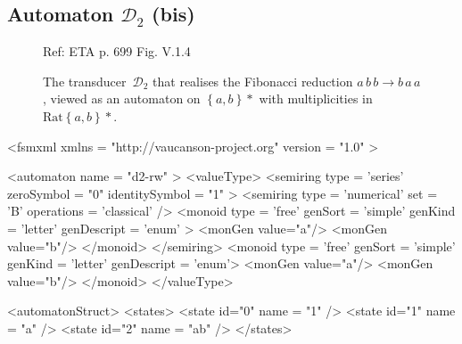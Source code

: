 \subsection{Automaton $\mathcal{D}_{2}$ (bis)}
\label{automatonD2rw}
\begin{figure}[h]
  \begin{minipage}[c]{.60\textwidth}
    Ref: ETA p. 699  Fig. V.1.4

    The transducer~$\mathcal{D}_{2}$ that realises the Fibonacci reduction 
    $a\, b\, b \rightarrow b\, a\, a$, viewed as an automaton on 
    $\left\{ a,b \right\}*$ with multiplicities in $\mathrm{Rat}\left\{ a,b \right\}*$.
  \end{minipage}
  \begin{minipage}[c]{.40\textwidth}


  \end{minipage}
\end{figure}

{\footnotesize 
\begin{listing}[5]{1} 
<fsmxml  xmlns   = "http://vaucanson-project.org" 
         version = "1.0" > 

<automaton name = "d2-rw" >
  <valueType>
    <semiring  type       = 'series'
               zeroSymbol     = "0"
               identitySymbol = "1" >
      <semiring  type       = 'numerical'
                 set        = 'B'
                 operations = 'classical' /> 
      <monoid    type       = 'free'
                 genSort    = 'simple' 
                 genKind    = 'letter' 
                 genDescript = 'enum' > 
        <monGen value="a"/>
        <monGen value="b"/>
      </monoid>
    </semiring>
    <monoid    type       = 'free'
               genSort    = 'simple' 
               genKind    = 'letter' 
               genDescript = 'enum'> 
      <monGen value="a"/>
      <monGen value="b"/>
    </monoid>
  </valueType>

  <automatonStruct>
    <states>
      <state  id="0"  name = "1" />
      <state  id="1"  name = "a" />
      <state  id="2"  name = "ab" />
    </states>
\end{listing}
}

